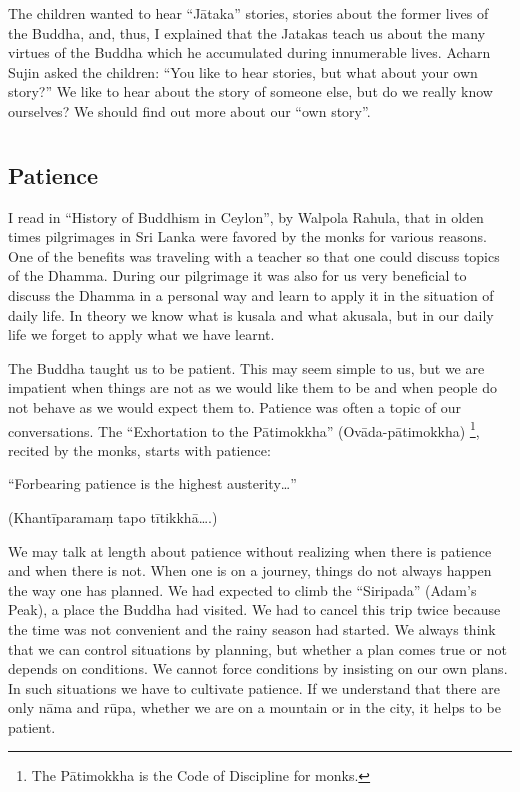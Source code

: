 The children wanted to hear ``Jātaka'' stories, stories about the former
lives of the Buddha, and, thus, I explained that the Jatakas teach us
about the many virtues of the Buddha which he accumulated during
innumerable lives. Acharn Sujin asked the children: ``You like to hear
stories, but what about your own story?'' We like to hear about the
story of someone else, but do we really know ourselves? We should find
out more about our ``own story''.



\chapter[Patience]{}
\section*{Patience}

I read in ``History of Buddhism in Ceylon'', by Walpola Rahula, that in
olden times pilgrimages in Sri Lanka were favored by the monks for
various reasons. One of the benefits was traveling with a teacher so
that one could discuss topics of the Dhamma. During our pilgrimage it
was also for us very beneficial to discuss the Dhamma in a personal way
and learn to apply it in the situation of daily life. In theory we know
what is kusala and what akusala, but in our daily life we forget to
apply what we have learnt.

The Buddha taught us to be patient. This may seem simple to us, but we
are impatient when things are not as we would like them to be and when
people do not behave as we would expect them to. Patience was often a
topic of our conversations. The ``Exhortation to the Pātimokkha''
(Ovāda-pātimokkha)
\footnote{The Pātimokkha is the Code of
Discipline for monks.},
recited by the monks, starts with patience:

``Forbearing patience is the highest austerity\ldots{}''

(Khantīparamaṃ tapo tītikkhā\ldots{}.)

We may talk at length about patience without realizing when there is
patience and when there is not. When one is on a journey, things do not
always happen the way one has planned. We had expected to climb the
``Siripada'' (Adam's Peak), a place the Buddha had visited. We had to
cancel this trip twice because the time was not convenient and the rainy
season had started. We always think that we can control situations by
planning, but whether a plan comes true or not depends on conditions. We
cannot force conditions by insisting on our own plans. In such
situations we have to cultivate patience. If we understand that there
are only nāma and rūpa, whether we are on a mountain or in the city, it
helps to be patient.

